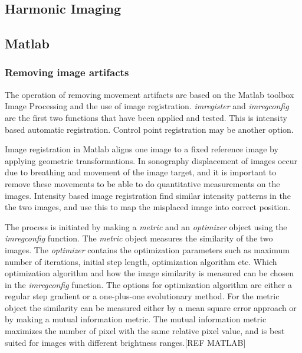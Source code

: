 \subsection{Harmonic Imaging}

\subsection{Matlab}
\subsubsection{Removing image artifacts}
The operation of removing movement artifacts are based on the Matlab toolbox Image Processing and the use of image registration. \textit{imregister} and \textit{imregconfig} are the first two functions that have been applied and tested. This is intensity based automatic registration. Control point registration may be another option.

Image registration in Matlab aligns one image to a fixed reference image by applying geometric transformations. In sonography displacement of images occur due to breathing and movement of the image target, and it is important to remove these movements to be able to do quantitative measurements on the images. Intensity based image registration find similar intensity patterns in the    the two images, and use this to map the misplaced image into correct position. 

The process is initiated by making a \textit{metric} and an \textit{optimizer} object using the \textit{imregconfig} function. The \textit{metric} object measures the similarity of the two images. The \textit{optimizer} contains the optimization parameters such as maximum number of iterations, initial step length, optimization algorithm etc. Which optimization algorithm and how the image similarity is measured can be chosen in the \textit{imregconfig} function. The options for optimization algorithm are either a regular step gradient or a one-plus-one evolutionary method. For the metric object the similarity can be measured either by a mean square error approach or by making a mutual information metric. The mutual information metric maximizes the number of pixel with the same relative pixel value, and is best suited for images with different brightness ranges.[REF MATLAB]










